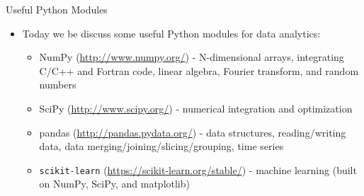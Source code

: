 \documentclass[xcolor=svgnames, colorlinks, handout]{beamer}
\begin{document}
\begin{frame}{Useful Python Modules}
\begin{itemize}
\item Today we be discuss some useful Python modules for data analytics:
\vfill
\begin{itemize}
\item NumPy (\url{http://www.numpy.org/}) - N-dimensional arrays, integrating C/C++ and Fortran code, linear algebra,  Fourier transform, and random numbers
\vfill
\item SciPy (\url{http://www.scipy.org/}) - numerical integration and optimization
\vfill
\vfill
\item pandas (\url{http://pandas.pydata.org/}) - data structures, reading/writing data, data merging/joining/slicing/grouping, time series
\vfill
\item {\tt scikit-learn} (\url{https://scikit-learn.org/stable/}) - machine learning (built on NumPy, SciPy, and matplotlib)
\vfill
\end{itemize}
\end{itemize}
\end{frame}
\end{document}
